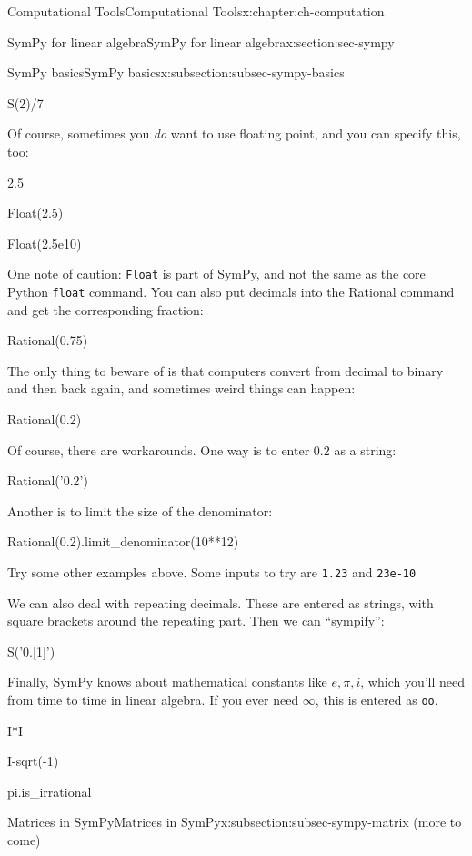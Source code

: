 \documentclass[oneside,10pt,]{book}
\newcommand{\mono}[1]{\texttt{#1}}
\numberwithin{equation}{section}
\begin{document}
\begin{chapterptx}{Computational Tools}{}{Computational Tools}{}{}{x:chapter:ch-computation}
\begin{sectionptx}{SymPy for linear algebra}{}{SymPy for linear algebra}{}{}{x:section:sec-sympy}
\begin{subsectionptx}{SymPy basics}{}{SymPy basics}{}{}{x:subsection:subsec-sympy-basics}
\begin{sageinput}
S(2)/7
\end{sageinput}
Of course, sometimes you \emph{do} want to use floating point, and you can specify this, too:%
\begin{sageinput}
2.5
\end{sageinput}
\begin{sageinput}
Float(2.5)
\end{sageinput}
\begin{sageinput}
Float(2.5e10)
\end{sageinput}
One note of caution: \mono{Float} is part of SymPy, and not the same as the core Python \mono{float} command. You can also put decimals into the Rational command and get the corresponding fraction:%
\begin{sageinput}
Rational(0.75)
\end{sageinput}
The only thing to beware of is that computers convert from decimal to binary and then back again, and sometimes weird things can happen:%
\begin{sageinput}
Rational(0.2)
\end{sageinput}
Of course, there are workarounds. One way is to enter \(0.2\) as a string:%
\begin{sageinput}
Rational('0.2')
\end{sageinput}
Another is to limit the size of the denominator:%
\begin{sageinput}
Rational(0.2).limit_denominator(10**12)
\end{sageinput}
Try some other examples above. Some inputs to try are \mono{1.23} and \mono{23e-10}%
\par
We can also deal with repeating decimals. These are entered as strings, with square brackets around the repeating part. Then we can ``sympify'':%
\begin{sageinput}
S('0.[1]')
\end{sageinput}
Finally, SymPy knows about mathematical constants like \(e, \pi, i\), which you'll need from time to time in linear algebra. If you ever need \(\infty\), this is entered as \mono{oo}.%
\begin{sageinput}
I*I
\end{sageinput}
\begin{sageinput}
I-sqrt(-1)
\end{sageinput}
\begin{sageinput}
pi.is_irrational
\end{sageinput}
\end{subsectionptx}
%
%
\typeout{************************************************}
\typeout{************************************************}
%
\begin{subsectionptx}{Matrices in SymPy}{}{Matrices in SymPy}{}{}{x:subsection:subsec-sympy-matrix}
(more to come)%
\end{subsectionptx}
\end{sectionptx}
\end{chapterptx}
\end{document}
